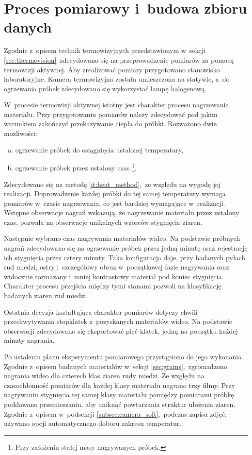 \section{Proces pomiarowy i~budowa zbioru danych}
\label{sec:measure}
Zgodnie z~opisem technik termowizyjnych przedstawionym w~sekcji
\ref{sec:thermovision}~zdecydowano się na przeprowadzenie pomiarów za pomocą
termowizji aktywnej.
Aby zrealizować pomiary przygotowano stanowisko laboratoryjne.
Kamera termowizyjna została umieszczona na statywie, a~do ogrzewania próbek
zdecydowano się wykorzystać lampę halogenową.

W~procesie termowizji aktywnej istotny jest charakter procesu nagrzewania
materiału.
Przy przygotowaniu pomiarów należy zdecydować pod jakim warunkiem zakończyć
przekazywanie ciepła do próbki.
Rozważono dwie możliwości:
\begin{enumerate}[a)]
    \item ogrzewanie próbek do osiągnięcia ustalonej temperatury,
    \item \label{it:heat_method}
          ogrzewanie próbek przez ustalony czas%
          \footnote{%
              Przy założeniu stałej masy nagrywanych próbek.
          }.
\end{enumerate}
Zdecydowano się na metodę \ref{it:heat_method},~ze względu na wygodę jej
realizacji.
Doprowadzenie każdej próbki do tej samej temperatury wymaga pomiarów w~czasie
nagrzewania, co jest bardziej wymagające w~realizacji.
Wstępne obserwacje nagrań wskazują, że nagrzewanie materiału przez ustalony
czas, pozwala na obserwacje unikalnych wzorców stygnięcia ziaren.

Następnie wybrano czas nagrywania materiałów wideo.
Na podstawie próbnych nagrań zdecydowano się na ogrzewanie próbek przez jedną
minutę oraz rejestrację ich stygnięcia przez cztery minuty.
Taka konfiguracja daje, przy badanych pyłach rud miedzi, ostry i~szczegółowy
obraz w~początkowej fazie nagrywania oraz widocznie rozmazany i~mniej
kontrastowy materiał pod koniec stygnięcia.
Charakter procesu przejścia między tymi stanami pozwoli na klasyfikację badanych
ziaren rud miedzi.

Ostatnia decyzja kształtująca charakter pomiarów dotyczy chwili przechwytywania
stopklatek z~pozyskanych materiałów wideo.
Na podstawie obserwacji zdecydowano się eksportować pięć klatek, jedną na
początku każdej minuty nagrania.

Po ustaleniu planu eksperymentu pomiarowego przystąpiono do jego wykonania.
Zgodnie z~opisem badanych materiałów w~sekcji \ref{sec:grains},~zgromadzono
nagrania wideo dla czterech klas ziaren rudy miedzi.
Ze względu na czasochłonność pomiarów dla każdej klasy materiału nagrano trzy
filmy.
Przy nagrywaniu stygnięcia tej samej klasy materiału pomiędzy pomiarami próbkę
poddawano przemieszaniu, aby uniknąć powtarzania struktur ułożenia ziaren.
Zgodnie z~opisem w~podsekcji \ref{subsec:camera_soft},~podczas zapisu zdjęć,
używano opcji automatycznego doboru zakresu temperatur.

